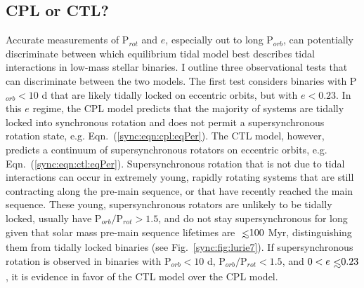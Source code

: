 

\subsection{CPL or CTL?} \label{sync:sec:whichModel}

Accurate measurements of P$_{rot}$ and $e$, especially out to long P$_{orb}$, can potentially discriminate between which equilibrium tidal model best describes tidal interactions in low-mass stellar binaries. I outline three observational tests that can discriminate between the two models. The first test considers binaries with P$_{orb} < 10$ d that are likely tidally locked on eccentric orbits, but with $e < 0.23$.  In this $e$ regime, the CPL model predicts that the majority of systems are tidally locked into synchronous rotation and does not permit a supersynchronous rotation state, e.g. Eqn.~(\ref{sync:eqn:cpl:eqPer}). The CTL model, however, predicts a continuum of supersynchronous rotators on eccentric orbits, e.g. Eqn.~(\ref{sync:eqn:ctl:eqPer}). Supersynchronous rotation that is not due to tidal interactions can occur in extremely young, rapidly rotating systems that are still contracting along the pre-main sequence, or that have recently reached the main sequence.  These young, supersynchronous rotators are unlikely to be tidally locked, usually have P$_{orb}/$P$_{rot} > 1.5$, and do not stay supersynchronous for long given that solar mass pre-main sequence lifetimes are $\lsim 100$ Myr, distinguishing them from tidally locked binaries (see Fig.~\ref{sync:fig:lurie7}).   If supersynchronous rotation is observed in binaries with P$_{orb} < 10$ d, P$_{orb}/$P$_{rot} < 1.5$, and $0 < e \lsim 0.23$, it is evidence in favor of the CTL model over the CPL model. 

